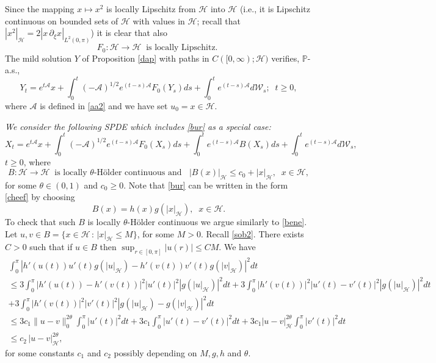 \documentclass[preprint]{imsart}
\def\P{\mathbb P}
\def\A{\mathcal A}
\def\H{\mathcal  H}
\def\W{\mathcal  W}
\begin{document}
   Since the mapping $x \mapsto x^2$ is  locally Lipschitz   from  $\H$ into $\H$   (i.e., it is Lipschitz continuous  on bounded sets of $\H$ with values in $\H$; recall that $|x^2|_{\H} = 2 |x \, \partial_{\xi} x|_{L^2(0,\pi)}$)
it is clear that also
\begin{equation} \label{f0} 
  F_0: \H \to \H  \;\; \text{is locally  Lipschitz.  }
\end{equation}
The mild solution $Y $ of Proposition \ref{dap} with paths in $C([0,\infty); \H)$ verifies, $\P$-a.s.,
\begin{equation}
  \label{mq144}
Y_{t}=e^{t \A }x +\int_{0}^{t}(- \A)^{1/2}e^{(  t-s)  \A}F_0  (
Y_{s})ds + \int_{0}^{t}e^{(  t-s)  \A}d \W_{s};\;\; t \ge 0, 
\end{equation}
 where $\A$ is defined in \eqref{aa2} and we have set $u_0=x \in \H$.
  
  \smallskip 
  {\sl We consider the following  SPDE which includes 
    \eqref{bur} as a special case:}
 \begin{equation}
  \label{cheef}
X_t = e^{t \A }x +\int_{0}^{t}(- \A)^{1/2}e^{(  t-s)  \A}F_0  (
X_{s})ds
 + \int_{0}^{t} e^{(  t-s)  \A} B  (
X_{s})ds 
+
\int_{0}^{t}e^{(  t-s)  \A}d \W_{s},
 \end{equation}
$t \ge 0 $, where  
\begin{equation}\label{nonl}
B: \H \to \H \; \; \text{is locally $\theta$-H\"older  continuous  and } \;\;  |B(x)|_{\H} \le c_0 +  |x|_{\H}, \;\; x \in \H,
\end{equation}
 for some $\theta \in (0,1)$ and $c_0 \ge 0.$ 
 Note that  \eqref{bur} can be written in the form \eqref{cheef} by choosing  
 \begin{equation} \label{s444}
B(x) = h(x)   g(| x|_{\H}), \;\; x \in \H. 
 \end{equation} 
 To check that such $B$ is locally $\theta$-H\"older  continuous we argue similarly to \eqref{bene}.
 Let  $u,v \in B =\{ x \in \H \, :\, |x|_{\H} \le M \}$, for some $M>0$.  Recall  \eqref{sob2}.   
 There exists $C>0$ such that if $u \in B $ then $\sup_{r \in [0, \pi]} |u(r)|  \le CM$.  
We have 
\begin{gather*} \nonumber
\int_0^{\pi} |h'(u(t)) u'(t) g(|u|_{\H}) - h'(v(t)) v'(t) g(|v|_{\H})|^2 dt \\ 
\nonumber \le 
3 \int_0^{ \pi} |h'(u(t)) - h'(v(t))|^2  |u'(t)|^2  |g(|u|_{\H})|^2 dt 
+
 3 \int_0^{ \pi} |h'(v(t))|^2  |u'(t) - v'(t)|^2  |g(|u|_{\H})|^2 dt
\\
+ 3 \int_0^{ \pi} |h'(v(t))|^2  |v'(t)|^2  |g(|u|_{\H}) -  g(|v|_{\H})|^2 dt 
\\
\le 3 c_1 \| u -v \|_0^{2\theta}  \int_0^{ \pi}   |u'(t)|^2   dt
+ 3
  c_1 \int_0^{ \pi}   |u'(t) - v'(t)|^2   dt + 3 c_1  | u - v |^{2\theta}_{\H}
  \int_0^{ \pi}  |v'(t)|^2  dt 
\\ \nonumber \le 
 c_2 
  \, | u - v |^{2\theta}_{\H},
\end{gather*}
for some constants $c_1$ and $c_2$ possibly depending on $M, g, h $ and $\theta$.  
     
\end{document}
